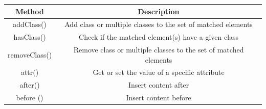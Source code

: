 \documentclass[]{book}
\begin{document}
\begin{longtable}[]{@{}cc@{}}
\toprule
\begin{minipage}[b]{0.42\columnwidth}\centering
Method\strut
\end{minipage} & \begin{minipage}[b]{0.52\columnwidth}\centering
Description\strut
\end{minipage}\tabularnewline
\midrule
\endhead
\begin{minipage}[t]{0.42\columnwidth}\centering
addClass()\strut
\end{minipage} & \begin{minipage}[t]{0.52\columnwidth}\centering
Add class or multiple classes to the set of matched elements\strut
\end{minipage}\tabularnewline
\begin{minipage}[t]{0.42\columnwidth}\centering
hasClass()\strut
\end{minipage} & \begin{minipage}[t]{0.52\columnwidth}\centering
Check if the matched element(s) have a given class\strut
\end{minipage}\tabularnewline
\begin{minipage}[t]{0.42\columnwidth}\centering
removeClass()\strut
\end{minipage} & \begin{minipage}[t]{0.52\columnwidth}\centering
Remove class or multiple classes to the set of matched elements\strut
\end{minipage}\tabularnewline
\begin{minipage}[t]{0.42\columnwidth}\centering
attr()\strut
\end{minipage} & \begin{minipage}[t]{0.52\columnwidth}\centering
Get or set the value of a specific attribute\strut
\end{minipage}\tabularnewline
\begin{minipage}[t]{0.42\columnwidth}\centering
after()\strut
\end{minipage} & \begin{minipage}[t]{0.52\columnwidth}\centering
Insert content after\strut
\end{minipage}\tabularnewline
\begin{minipage}[t]{0.42\columnwidth}\centering
before ()\strut
\end{minipage} & \begin{minipage}[t]{0.52\columnwidth}\centering
Insert content before\strut
\end{minipage}\tabularnewline

\end{longtable}
\end{document}
